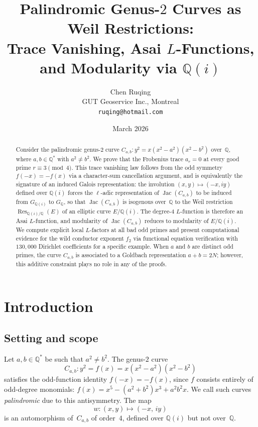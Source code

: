 \documentclass[11pt,a4paper]{article}
\title{Palindromic Genus-$2$ Curves as Weil Restrictions:\\
  Trace Vanishing, Asai $L$-Functions,\\
  and Modularity via $\mathbb{Q}(i)$}
\author{Chen Ruqing\\[4pt]
  \small GUT Geoservice Inc., Montreal\\
  \small\texttt{ruqing@hotmail.com}}
\date{March 2026}
\newcommand{\Jac}{\operatorname{Jac}}
\newcommand{\Res}{\operatorname{Res}}
\theoremstyle{definition}
\theoremstyle{remark}
\begin{document}
\maketitle

\begin{abstract}
Consider the palindromic genus-$2$ curve
$C_{a,b}\colon y^2 = x(x^2 - a^2)(x^2 - b^2)$ over~$\mathbb{Q}$,
where $a, b \in \mathbb{Q}^*$ with $a^2 \ne b^2$.
We prove that the Frobenius trace $a_r = 0$ at every good prime
$r \equiv 3 \pmod{4}$.
This trace vanishing law follows from the odd symmetry
$f(-x) = -f(x)$ via a character-sum cancellation argument, and is
equivalently the signature of an induced Galois representation: the
involution $(x,y) \mapsto (-x, iy)$ defined over $\mathbb{Q}(i)$
forces the $\ell$-adic representation of $\Jac(C_{a,b})$ to be
induced from $G_{\mathbb{Q}(i)}$ to $G_{\mathbb{Q}}$, so that
$\Jac(C_{a,b})$ is isogenous over~$\mathbb{Q}$ to the Weil
restriction $\Res_{\mathbb{Q}(i)/\mathbb{Q}}(E)$ of an elliptic
curve $E/\mathbb{Q}(i)$.
The degree-$4$ $L$-function is therefore an Asai $L$-function,
and modularity of $\Jac(C_{a,b})$ reduces to modularity of
$E/\mathbb{Q}(i)$.
We compute explicit local $L$-factors at all bad odd primes and
present computational evidence for the wild conductor exponent $f_2$
via functional equation verification with $130{,}000$ Dirichlet
coefficients for a specific example.
When $a$ and $b$ are distinct odd primes, the curve $C_{a,b}$
is associated to a Goldbach representation $a + b = 2N$; however,
this additive constraint plays no role in any of the proofs.
\end{abstract}


\section{Introduction}\label{sec:intro}

\subsection{Setting and scope}
Let $a, b \in \mathbb{Q}^*$ be such that $a^2 \ne b^2$.
The genus-$2$ curve
\begin{equation}\label{eq:curve}
  C_{a,b}\colon y^2 = f(x) = x(x^2 - a^2)(x^2 - b^2)
\end{equation}
satisfies the odd-function identity $f(-x) = -f(x)$, since $f$
consists entirely of odd-degree monomials:
$f(x) = x^5 - (a^2 + b^2)x^3 + a^2 b^2 x$.
We call such curves \emph{palindromic} due to this antisymmetry.
The map
\begin{equation}\label{eq:involution}
  w\colon (x, y) \longmapsto (-x,\, iy)
\end{equation}
is an automorphism of~$C_{a,b}$ of order~$4$, defined over
$\mathbb{Q}(i)$ but not over~$\mathbb{Q}$.
\end{document}
